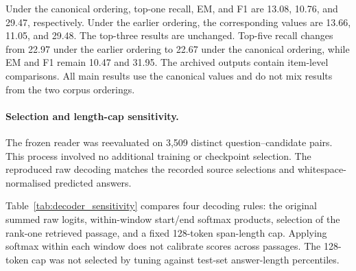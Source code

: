 \documentclass[pdflatex,sn-basic]{sn-jnl}%
\theoremstyle{thmstyleone}%
\theoremstyle{thmstyletwo}%
\theoremstyle{thmstylethree}%
\begin{document}
Under the canonical ordering, top-one recall, EM, and F1 are 13.08, 10.76,
and 29.47, respectively. Under the earlier ordering, the corresponding values
are 13.66, 11.05, and 29.48. The top-three results are unchanged. Top-five
recall changes from 22.97 under the earlier ordering to 22.67 under the
canonical ordering, while EM and F1 remain 10.47 and 31.95. The archived
outputs contain item-level comparisons. All main results use the canonical
values and do not mix results from the two corpus orderings.

\paragraph*{Selection and length-cap sensitivity.}
The frozen reader was reevaluated on 3,509 distinct question--candidate pairs.
This process involved no additional training or checkpoint selection. The
reproduced raw decoding matches the recorded source selections and
whitespace-normalised predicted answers.

Table~\ref{tab:decoder_sensitivity} compares four decoding rules: the original
summed raw logits, within-window start/end softmax products, selection of the
rank-one retrieved passage, and a fixed 128-token span-length cap. Applying
softmax within each window does not calibrate scores across passages. The
128-token cap was not selected by tuning against test-set answer-length
percentiles.
\end{document}
